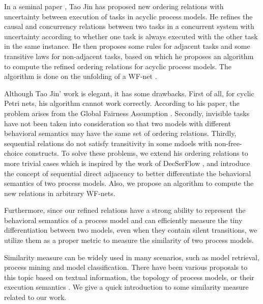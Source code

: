 \documentclass[dvips,...]{llncs}
\begin{document}
In a seminal paper \cite{jin2014computing}, Tao Jin has proposed new ordering relations with uncertainty between execution of tasks in acyclic process models. He refines the causal and concurrency relations between two tasks in a concurrent system with uncertainty according to whether one task is always executed with the other task in the same instance. He then proposes some rules for adjacent tasks and some transitive laws for non-adjacent tasks, based on which he proposes an algorithm to compute the refined ordering relations for acyclic process models. The algorithm is done on the unfolding of a WF-net \cite{mcmillan1995technique,esparza1996improvement}.

Although Tao Jin' work is elegant, it has some drawbacks. First of all, for cyclic Petri nets, his algorithm cannot work correctly. According to his paper, the problem arises from the Global Fairness Assumption \cite{kindler1999liveness}. Secondly, invisible tasks have not been taken into consideration so that two models with different behavioral semantics may have the same set of ordering relations. Thirdly, sequential relations do not satisfy transitivity in some mdoels with non-free-choice constructs. To solve these problems, we extend his ordering relations to more trivial cases which is inspired by the work of DecSerFlow \cite{van2006decserflow}, and introduce the concept of sequential direct adjacency to better differentiate the behavioral semantics of two process models. Also, we propose an algorithm to compute the new relations in arbitrary WF-nets.

Furthermore, since our refined relations have a strong ability to represent the behavioral semantics of a process model and can efficiently measure the tiny differentiation between two models, even when they contain silent transitions, we utilize them as a proper metric to measure the similarity of two process models.

Similarity measure can be widely used in many scenarios, such as model retrieval, process mining and model classification. There have been various proposals to this topic based on textual information, the topology of process models, or their execution semantics \cite{weidlich2011efficient}. We give a quick introduction to some similarity measure related to our work.
\end{document}
